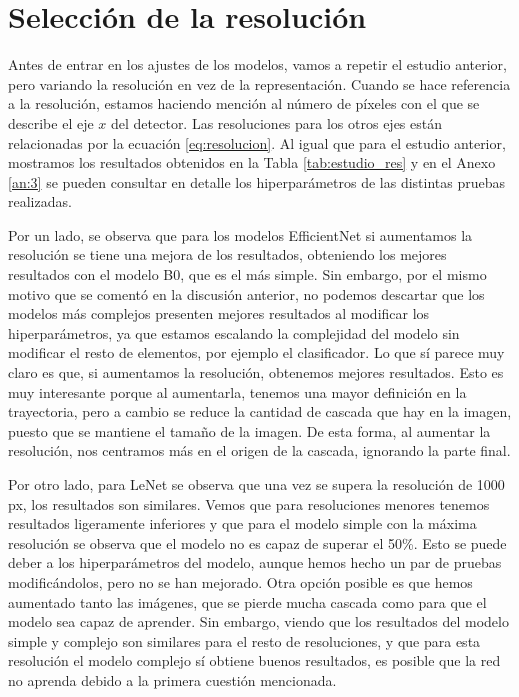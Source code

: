 \documentclass[a4paper,12pt,oneside,titlepage]{book}
\begin{document}
\section{Selección de la resolución}

Antes de entrar en los ajustes de los modelos, vamos a repetir el estudio anterior, pero variando la resolución en vez de la representación. Cuando se hace referencia a la resolución, estamos haciendo mención al número de píxeles con el que se describe el eje $x$ del detector. Las resoluciones para los otros ejes están relacionadas por la ecuación \ref{eq:resolucion}. Al igual que para el estudio anterior, mostramos los resultados obtenidos en la Tabla \ref{tab:estudio_res} y en el Anexo \ref{an:3} se pueden consultar en detalle los hiperparámetros de las distintas pruebas realizadas.
 
Por un lado, se observa que para los modelos EfficientNet si aumentamos la resolución se tiene una mejora de los resultados, obteniendo los mejores resultados con el modelo B0, que es el más simple. Sin embargo, por el mismo motivo que se comentó en la discusión anterior, no podemos descartar que los modelos más complejos presenten mejores resultados al modificar los hiperparámetros, ya que estamos escalando la complejidad del modelo sin modificar el resto de elementos, por ejemplo el clasificador. Lo que sí parece muy claro es que, si aumentamos la resolución, obtenemos mejores resultados. Esto es muy interesante porque al aumentarla, tenemos una mayor definición en la trayectoria, pero a cambio se reduce la cantidad de cascada que hay en la imagen, puesto que se mantiene el tamaño de la imagen. De esta forma, al aumentar la resolución, nos centramos más en el origen de la cascada, ignorando la parte final.
 
Por otro lado, para LeNet se observa que una vez se supera la resolución de 1000 px, los resultados son similares. Vemos que para resoluciones menores tenemos resultados ligeramente inferiores y que para el modelo simple con la máxima resolución se observa que el modelo no es capaz de superar el 50\%. Esto se  puede deber a los hiperparámetros del modelo, aunque hemos hecho un par de pruebas modificándolos, pero no se han mejorado. Otra opción posible es que hemos aumentado tanto las imágenes, que se pierde mucha cascada como para que el modelo sea capaz de aprender. Sin embargo, viendo que los resultados del modelo simple y complejo son similares para el resto de resoluciones, y que para esta resolución el modelo complejo sí obtiene buenos resultados, es posible que la red no aprenda debido a la primera cuestión mencionada.
\end{document}
